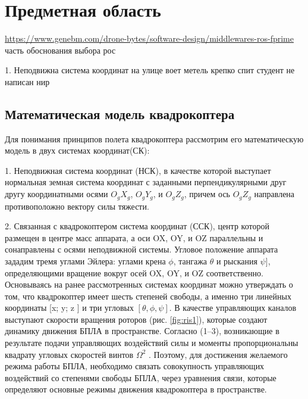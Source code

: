 
\section{Предметная область}

\url{https://www.genebm.com/drone-bytes/software-design/middlewares-ros-fprime} часть обоснования выбора рос

1. Неподвижна система координат
на улице воет метель
крепко спит студент
не написан нир


\subsection{Математическая модель квадрокоптера}
Для понимания принципов полета квадрокоптера рассмотрим его математическую модель в двух системах координат(СК):

1. Неподвижная система координат (НСК), в качестве которой выступает нормальная земная система координат с заданными перпендикулярными друг другу координатными осями \(O_{g}X_{g}\), \(O_{g}Y_{g}\), и \(O_{g}Z_{g}\), причем ось \(O_{g}Z_{g}\) направлена противоположно вектору силы тяжести.

2. Связанная с квадрокоптером система координат (ССК), центр которой размещен в центре масс аппарата, а оси OX, OY, и OZ параллельны и сонаправлены с осями неподвижной системы. Угловое положение аппарата зададим тремя углами Эйлера: углами крена \(\phi\), тангажа \(\theta\) и рыскания \(\psi]\), определяющими вращение вокруг осей OX, OY, и OZ соответственно. Основываясь на ранее рассмотренных системах координат можно утверждать о том, что квадрокоптер имеет шесть степеней свободы, а именно три линейных координаты [x; y; z ] и три угловых \([\theta, \phi, \psi]\). В качестве управляющих каналов выступают скорости вращения роторов (рис. \ref{fig:ris1}), которые создают динамику движения БПЛА в пространстве. Согласно (1–3), возникающие в результате подачи управляющих воздействий силы и моменты пропорциональны квадрату угловых скоростей винтов \(\Omega^2\) . Поэтому, для достижения желаемого режима работы БПЛА, необходимо связать совокупность управляющих воздействий со степенями свободы БПЛА, через уравнения связи, которые определяют основные режимы движения квадрокоптера в пространстве.


